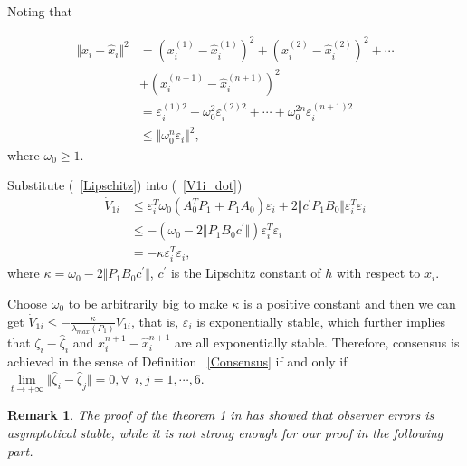 \documentclass[english]{cccconf}
\newtheorem{remark}{Remark}
\begin{document}
Noting that 

\begin{equation}
  \label{Lipschitz}
  \begin{align} 
   {\Vert {x_i- \hat x_i} \Vert}^2 &= (x_i^{(1)}-\hat x_i^{(1)})^2 +  (x_i^{(2)}-\hat x_i^{(2)})^2 + \cdots \\ & +(x_i^{(n+1)}-\hat x_i^{(n+1)})^2\\ &= \varepsilon_i^{(1)2} + \omega_0^2 \varepsilon_i^{(2)2} + \cdots + \omega_0^{2n} \varepsilon_i^{(n+1)2}\\ &\le {\Vert \omega_0^{n} \varepsilon_i \Vert}^2 ,
  \end{align}
\end{equation} where $\omega_0 \geq 1$.

Substitute (~\ref{Lipschitz}) into (~\ref{V1i_dot})
\begin{equation}
\label{V1i_dot2}
\begin{align}
\dot V_{1i} &\le \varepsilon^T_i \omega_0 (A_0^T P_1 + P_1 A_0 ) \varepsilon_i + 2 \Vert c^{'} P_1 B_0 \Vert \varepsilon^T_i \varepsilon_i \\ &\le -(\omega_0 - 2\Vert P_{1}B_{0}c^{'} \Vert) \varepsilon^T_i \varepsilon_i\\ &= -\kappa \varepsilon^T_i \varepsilon_i,
\end{align}  
\end{equation}where $\kappa = \omega_0 - 2\Vert P_{1}B_{0}c^{'} \Vert$, $c^{'}$ is the Lipschitz constant of $h$ with respect to $x_i$. 

Choose $\omega_0$ to be arbitrarily big to make $\kappa$ is a positive constant and then we can get $\dot V_{1i} \le -\frac{\kappa}{\lambda_{max}(P_1)} V_{1i}$, that is, $\varepsilon_i$ is exponentially stable, which further implies that $\zeta_i - \hat \zeta_i$ and $x_i^{n+1} - \hat x_i^{n+1}$ are all exponentially stable. Therefore, consensus is achieved in the sense of Definition ~\ref{Consensus} if and only if $\mathop{lim}\limits_{t \to +\infty} \Vert \hat \zeta_i - \hat \zeta_j \Vert = 0, \forall ~~i, j=1,\cdots,6$.

\begin{remark}
The proof of the theorem 1 in \cite{Zheng2008} has showed that observer errors is asymptotical stable, while it is not strong enough for our proof in the following part.
\end{remark}


    
\end{document}
